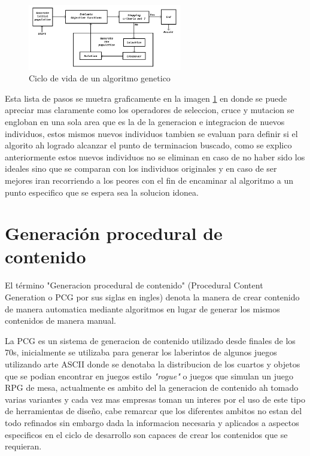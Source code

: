 \begin{figure}
    \centering
    \includegraphics[width=0.6\textwidth]{img/ga_life_cycle.png}
    \caption{Ciclo de vida de un algoritmo genetico}
    \label{figure:GA-Cycle}
\end{figure}

Esta lista de pasos se muetra graficamente en la imagen \ref{figure:GA-Cycle} en
donde se puede apreciar mas claramente como los operadores de seleccion, cruce y
mutacion se engloban en una sola area que es la de la generacion e integracion
de nuevos individuos, estos mismos nuevos individuos tambien se evaluan para
definir si el algorito ah logrado alcanzar el punto de terminacion buscado, como
se explico anteriormente estos nuevos individuos no se eliminan en caso de no
haber sido los ideales sino que se comparan con los individuos originales y en
caso de ser mejores iran recorriendo a los peores con el fin de encaminar al
algoritmo a un punto especifico que se espera sea la solucion idonea.

\section{Generación procedural de contenido}
\label{section:PCG}

El término "Generacion procedural de contenido" (Procedural Content Generation o
PCG por sus siglas en ingles) denota la manera de crear contenido de manera
automatica mediante algoritmos en lugar de generar los mismos contenidos de
manera manual.

La PCG es un sistema de generacion de contenido utilizado desde finales de los
70s, inicialmente se utilizaba para generar los laberintos de algunos juegos
utilizando arte ASCII donde se denotaba la distribucion de los cuartos y objetos
que se podian encontrar en juegos estilo \textit{"rogue"} o juegos que simulan
un juego RPG de mesa, actualmente es ambito del la generacion de contenido ah
tomado varias variantes y cada vez mas empresas toman un interes por el uso de
este tipo de herramientas de diseño, cabe remarcar que los diferentes ambitos no
estan del todo refinados sin embargo dada la informacion necesaria y aplicados a
aspectos especificos en el ciclo de desarrollo son capaces de crear los
contenidos que se requieran.

